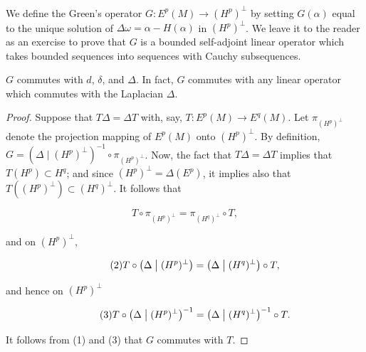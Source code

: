 \begin{definition}\label{thm:6.9}
We define the Green's operator $G: E^p(M) \to (H^p)^\perp$ by setting $G(\alpha)$ equal to the unique solution of $\Delta\omega = \alpha - H(\alpha)$ in $(H^p)^\perp$. We leave it to the reader as an exercise to prove that $G$ is a bounded self-adjoint linear operator which takes bounded sequences into sequences with Cauchy subsequences. 

\end{definition}

\begin{proposition}\label{thm:6.10}
$G$ commutes with $d$, $\delta$, and $\Delta$. In fact, $G$ commutes with any linear operator which commutes with the Laplacian $\Delta$.

\end{proposition}

\begin{proof}
Suppose that $T\Delta = \Delta T$ with, say, $T: E^p(M) \to E^q(M)$. Let $\pi_{(H^p)^\perp}$ denote the projection mapping of $E^p(M)$ onto $(H^p)^\perp$. By definition, $G = (\Delta \mid (H^p)^\perp)^{-1} \circ \pi_{(H^p)^\perp}$. Now, the fact that $T\Delta = \Delta T$ implies that $T(H^p) \subset H^q$; and since $(H^p)^\perp = \Delta(E^p)$, it implies also that $T((H^p)^\perp) \subset (H^q)^\perp$. It follows that

\begin{equation}
\tag{1}\label{eq:6.10:1}
T\circ\pi_{(H^{p})^{\perp}}=\pi_{(H^{q})^{\perp}}\circ T,
\end{equation}

and on  $ (H^{p})^{\perp} $,

\begin{equation}
\tag{2}\label{eq:6.10:2}
T\circ\left(\Delta\bigm|(H^{p})^{\perp}\right)=\left(\Delta\bigm|(H^{q})^{\perp}\right)\circ T,
\end{equation}

and hence on  $ (H^{p})^{\perp} $

\begin{equation}
\tag{3}\label{eq:6.10:3}
T\circ\bigl(\Delta\bigm|(H^{p})^{\perp}\bigr)^{-1}=\bigl(\Delta\bigm|(H^{q})^{\perp}\bigr)^{-1}\circ T.
\end{equation}

It follows from (1) and (3) that $G$ commutes with $T$.

\end{proof}

